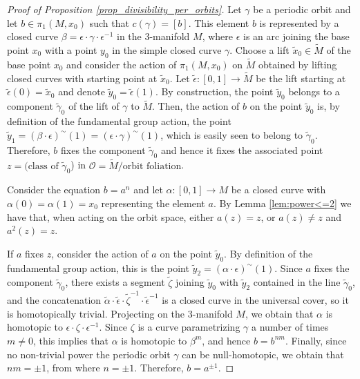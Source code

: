\documentclass[12pt]{amsart}
\theoremstyle{definition}
\theoremstyle{remark}
\renewcommand{\O}{\mathcal{O}}
\begin{document}
\begin{proof}[Proof of Proposition \ref{prop_divisibility_per_orbits}]
Let $\gamma$ be a periodic orbit and let $b\in\pi_1(M,x_0)$ such that $c(\gamma)=[b]$. This element $b$ is represented by a closed curve $\beta=\epsilon\cdot\gamma\cdot\epsilon^{-1}$ in the 3-manifold $M$, where $\epsilon$ is an arc joining the base point $x_0$ with a point $y_0$ in the simple closed curve $\gamma$. Choose a lift $\tilde{x}_0\in\tilde{M}$ of the base point $x_0$ and consider the action of $\pi_1(M,x_0)$ on $\tilde{M}$ obtained by lifting closed curves with starting point at $\tilde{x}_0$. Let $\tilde{\epsilon}:[0,1]\to\tilde{M}$ be the lift starting at $\tilde{\epsilon}(0)=\tilde{x}_0$ and denote $\tilde{y}_0=\tilde{\epsilon}(1)$. By construction, the point $\tilde{y}_0$ belongs to a component $\tilde{\gamma}_0$ of the lift of $\gamma$ to $\tilde{M}$. Then, the action of $b$ on the point $\tilde{y}_0$ is, by definition of the fundamental group action, the point 
$\tilde{y}_1=(\beta\cdot\epsilon)^{\sim}(1)=(\epsilon\cdot\gamma)^{\sim}(1)$, which is easily seen to belong to $\tilde{\gamma}_0$. Therefore, $b$ fixes the component $\tilde{\gamma}_0$ and hence it fixes the associated point $z=(\text{class of }\tilde{\gamma}_0$) in $\O=\tilde{M}/\text{orbit foliation}$. 


Consider the equation $b=a^n$ and let $\alpha:[0,1]\to M$ be a closed curve with $\alpha(0)=\alpha(1)=x_0$ representing the element $a$. By Lemma \ref{lem:power<=2} we have that, when acting on the orbit space, either $a(z)=z$, or $a(z)\neq z$ and $a^2(z)=z$. 


If $a$ fixes $z$, consider the action of $a$ on the point $\tilde{y}_0$. By definition of the fundamental group action, this is the point 
$\tilde{y}_2=(\alpha\cdot\epsilon)^{\sim}(1)$. Since $a$ fixes the component $\tilde{\gamma}_0$, there exists a segment $\tilde{\zeta}$ joining $\tilde{y}_0$ with $\tilde{y}_2$ contained in the line $\tilde{\gamma}_0$, and the concatenation $\tilde\alpha\cdot\tilde\epsilon\cdot\tilde{\zeta}^{-1}\cdot\tilde\epsilon^{-1}$ is a closed curve in the universal cover, so it is homotopically trivial. Projecting on the 3-manifold $M$, we obtain that $\alpha$ is homotopic to $\epsilon\cdot\zeta\cdot\epsilon^{-1}$. Since $\zeta$ is a curve parametrizing $\gamma$ a number of times $m\neq 0$, this implies that $\alpha$ is homotopic to $\beta^m$, and hence $b=b^{nm}$. Finally, since no non-trivial power the periodic orbit $\gamma$ can be null-homotopic, we obtain that $nm=\pm 1$, from where $n=\pm 1$. Therefore, $b=a^{\pm 1}$.



\end{proof}
\end{document}
